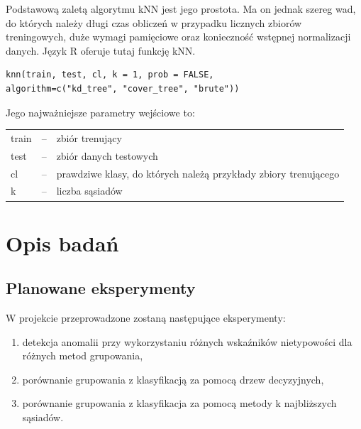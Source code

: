 \documentclass[11pt,a4paper,twoside]{article}
\begin{document}
Podstawową zaletą algorytmu kNN jest jego prostota. Ma on jednak szereg wad, do których należy długi czas obliczeń w przypadku licznych zbiorów treningowych, duże wymagi pamięciowe oraz konieczność wstępnej normalizacji danych. Język R oferuje tutaj funkcję kNN.

\begin{verbatim}
knn(train, test, cl, k = 1, prob = FALSE, 
algorithm=c("kd_tree", "cover_tree", "brute"))
\end{verbatim} 

Jego najważniejsze parametry wejściowe to:

\begin{table}[H]
\label{kNN_params}
\centering
\begin{tabularx}{\textwidth}{lcX}
train & -- & zbiór trenujący \\
test & -- & zbiór danych testowych \\
cl & -- & prawdziwe klasy, do których należą przykłady zbiory trenującego \\
k & -- & liczba sąsiadów \\
\end{tabularx}
\end{table}

\section{Opis badań}
\subsection{Planowane eksperymenty}

W projekcie przeprowadzone zostaną następujące eksperymenty:

\begin{enumerate}
  \item detekcja anomalii przy wykorzystaniu różnych wskaźników nietypowości dla różnych metod grupowania,
  \item porównanie grupowania z klasyfikacją za pomocą drzew decyzyjnych,
  \item porównanie grupowania z klasyfikacja za pomocą metody k najbliższych sąsiadów.
\end{enumerate}

\end{document}
